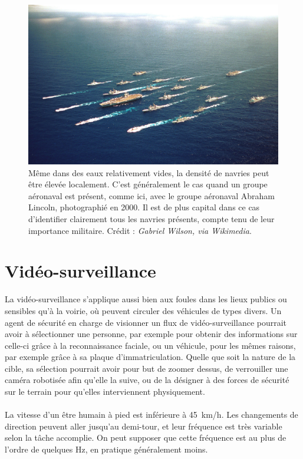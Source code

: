 	\begin{figure}[htb]
		\centering
		\includegraphics[width=\textwidth]{figures/lincoln}
		\caption{Même dans des eaux relativement vides, la densité de navries peut être élevée localement. C'est généralement le cas quand un groupe aéronaval est présent, comme ici, avec le groupe aéronaval Abraham Lincoln, photographié en 2000. Il est de plus capital dans ce cas d'identifier clairement tous les navries présents, compte tenu de leur importance militaire. Crédit : \emph{Gabriel Wilson, via Wikimedia}.}
		\label{fig:lincoln}
	\end{figure}
	
	\section{Vidéo-surveillance}
	La vidéo-surveillance s'applique aussi bien aux foules dans les lieux publics ou sensibles qu'à la voirie, où peuvent circuler des véhicules de types divers. Un agent de sécurité en charge de visionner un flux de vidéo-surveillance pourrait avoir à sélectionner une personne, par exemple pour obtenir des informations sur celle-ci grâce à la reconnaissance faciale, ou un véhicule, pour les mêmes raisons, par exemple grâce à sa plaque d'immatriculation. Quelle que soit la nature de la cible, sa sélection pourrait avoir pour but de zoomer dessus, de verrouiller une caméra robotisée afin qu'elle la suive, ou de la désigner à des forces de sécurité sur le terrain pour qu'elles interviennent physiquement.
	
	\paragraph{}
	La vitesse d'un être humain à pied est inférieure à 45~km/h. Les changements de direction peuvent aller jusqu'au demi-tour, et leur fréquence est très variable selon la tâche accomplie. On peut supposer que cette fréquence est au plus de l'ordre de quelques Hz, en pratique généralement moins.

